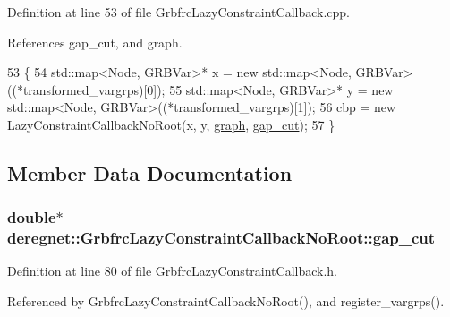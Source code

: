 Definition at line 53 of file Grbfrc\+Lazy\+Constraint\+Callback.\+cpp.



References gap\+\_\+cut, and graph.


\begin{DoxyCode}
53                                                           \{
54     std::map<Node, GRBVar>* x = \textcolor{keyword}{new} std::map<Node, GRBVar>((*transformed\_vargrps)[0]);
55     std::map<Node, GRBVar>* y = \textcolor{keyword}{new} std::map<Node, GRBVar>((*transformed\_vargrps)[1]);
56     cbp = \textcolor{keyword}{new} LazyConstraintCallbackNoRoot(x, y, \hyperlink{classderegnet_1_1GrbfrcLazyConstraintCallbackNoRoot_a0c5b7bfa966879cc74fea0ea1c5c864c}{graph}, \hyperlink{classderegnet_1_1GrbfrcLazyConstraintCallbackNoRoot_ac8425029e6bb6929bc08c261f203cccf}{gap\_cut});
57 \}
\end{DoxyCode}


\subsection{Member Data Documentation}
\subsubsection[{\texorpdfstring{gap\+\_\+cut}{gap_cut}}]{\setlength{\rightskip}{0pt plus 5cm}double$\ast$ deregnet\+::\+Grbfrc\+Lazy\+Constraint\+Callback\+No\+Root\+::gap\+\_\+cut\hspace{0.3cm}{\ttfamily [private]}}\hypertarget{classderegnet_1_1GrbfrcLazyConstraintCallbackNoRoot_ac8425029e6bb6929bc08c261f203cccf}{}\label{classderegnet_1_1GrbfrcLazyConstraintCallbackNoRoot_ac8425029e6bb6929bc08c261f203cccf}


Definition at line 80 of file Grbfrc\+Lazy\+Constraint\+Callback.\+h.



Referenced by Grbfrc\+Lazy\+Constraint\+Callback\+No\+Root(), and register\+\_\+vargrps().

